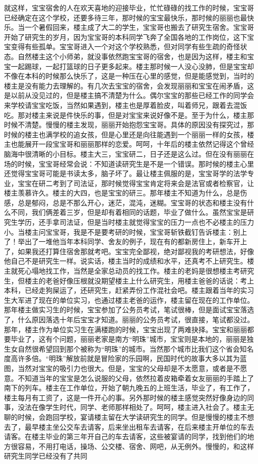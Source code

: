 就这样，宝宝宿舍的人在欢天喜地的迎接毕业，忙忙碌碌的找工作的时候，宝宝哥已经确定在这个学校，还要多待三年，那时候的宝宝最快乐，那时候的丽丽也最快乐。当一个暑假回来，楼主成了大二的学生，宝宝哥也搬去了研究生宿舍。宝宝哥开始了研究生的岁月，因为宝宝哥的本科同学飞奔了全国各地的工作岗位，这下宝宝变得有些孤单。宝宝哥进入一个对这个学校熟悉，但对同学有些生疏的奇怪状态。自然楼主这个小师弟，就没事依然跑宝宝哥的宿舍，也是因为这样，楼主和宝宝一起踢球，一起打篮球的日子更多起来。楼主那时候一人没心没肺，但是宝宝却不像在本科的时候那么快乐了，这是一种压在心里的感觉，但是能感觉到，当时的楼主是没有能力去理解的。有几次去宝宝的宿舍，会发现丽丽和宝宝在闹矛盾，这是以前从没见过的，但是楼主搞不清楚为什么。偶尔宝宝的那些已经工作的同学会来学校请宝宝吃饭，当然如果遇到，楼主也是厚着脸皮，叫着师兄，跟着去混饭吃。那对楼主来说是件快乐的事，但是对宝宝来说好像不是。至于为什么，楼主那时候不清楚。慢慢的楼主发现，丽丽开始抱怨宝宝哥。具体的原因没有探究过，那时候的楼主也满学校的追女孩，但是心里还是向往能遇到一个丽丽一样的女孩，楼主也能展开一段宝宝哥和丽丽那样的恋爱。呵呵，十年后的楼主依然记得这个曾经脑海中很清晰的小目标。楼主大三，宝宝研二，日子还是这么过。但在没有丽丽在场的时候，宝宝哥经常会说：不知道读研究生是不是一个错误。那时候的楼主心里还觉得宝宝哥可能是书读太多，脑子坏了。最让楼主佩服的是，宝宝哥学的法学专业，宝宝在研二考到了司法证，那时候觉得宝宝肯定将来会是法官或者检察官，让楼主羡慕许久。楼主的大四，也是宝宝的研三。那年楼主不知道为什么，总是伤感，总是郁闷，总是不那么开心，迷茫，混沌，迷糊。宝宝哥的状态和楼主没有什么不同，我们俩差着三岁，但是却有着相同的话题，毕业了做什么。虽然宝宝是研究生学历，还手拿司法证，但是当时楼主就觉得宝宝的压力一点也不必楼主的压力小。当楼主问宝宝哥，我是不是要考研的时候，宝宝哥斩铁截钉告诉楼主：别上了！举出了一堆他当年本科同学、舍友的例子，现在有的都新房住上，新车开上了，如果我还打算住宿舍那就考吧。宝宝完全鄙视，绝对鄙视我的考研想法，好像他自己不是研究生一样。说实话，楼主当时的成绩和水平，还真考不上研究生。楼主就死心塌地找工作，当然是全家总动员的找工作。楼主的老妈是很想楼主考研究生，但楼主的老爸好像压根就没期望楼主上什么研究生，用楼主爸爸的话说：考上本科，已经走狗屎运了，还研究生，赶紧弄份工作混社会吧。楼主跟着当年的实习生大军进了现在的单位实习，也通过楼主老爸的运作，楼主留在现在的工作单位。那年楼主做实习生的时候，宝宝参加了公务员考试，笔试很棒，但是面试宝宝落选了，什么原因落选十年后宝宝才知道。丽丽的公务员考试，很直接，笔试都没过。那年，楼主作为单位实习生在满楼跑的时候，宝宝出现了两难抉择。宝宝和丽丽都要毕业了，这有个问题，丽丽老家是南方“明珠”城市，宝宝则是本地的，丽丽是独生女自然很希望回到那个被称为“明珠”的城市。当然那个城市比我们这个省会知名度高许多倍。“明珠”解放前就是冒险家的乐园啊，民国时代的故事大多以其为蓝图，当然对宝宝的吸引力也很大。但是，宝宝的父母却是不太愿意，或者是不愿意。不知道当年的宝宝是怎么说服的父母，依然拉着皮箱牵着女友丽丽的手踏上了南下的列车。楼主在工作单位，开始了朝九晚五的上班生活，毕业了，有工作了，楼主每月有工资了，这是一件开心的事。另外那时候的楼主感觉突然好像身边的同事，没法在像学生时代，同学、老师那样相处了。呵呵，楼主进入社会了。楼主无聊的时候，会跑回学校，宴请楼主留在大学读研究生的同学。但是慢慢的楼主不想去了，最早楼主坐公交车去请客，后来坐出租车去请客，在后来楼主开单位的车去请客。在楼主毕业的第三年开自己的车去请客，这些被宴请的同学，找到他们的地方很容易，不用打电话，操场、公交楼、宿舍、网吧，从无例外。慢慢的，和这样研究生同学已经没有了共同